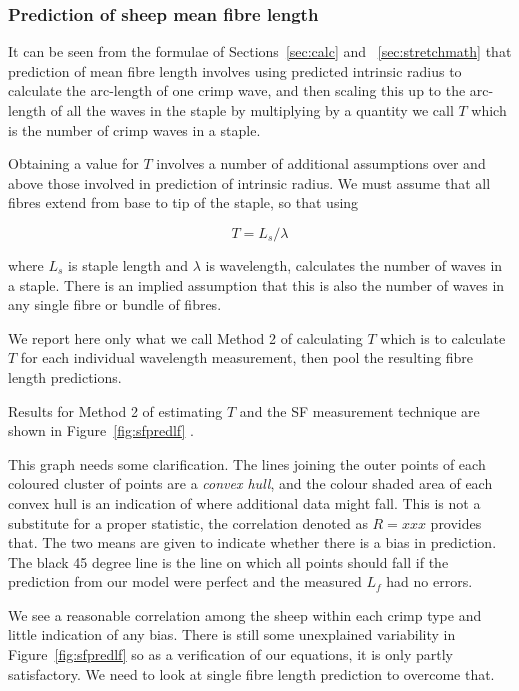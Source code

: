 \documentclass[titlepage,10pt]{article}  %
\begin{document}
\subsubsection{Prediction of sheep mean fibre length}
It can be seen from the formulae of Sections~\ref{sec:calc} and ~\ref{sec:stretchmath} that prediction of mean fibre length involves using predicted intrinsic radius to calculate the arc-length of one crimp wave, and then  scaling this up to the arc-length of all the waves in the staple by multiplying by a quantity we call $T$ which is the number of crimp waves in a staple.

Obtaining a value for $T$ involves a number of additional assumptions over and above those involved in prediction of intrinsic radius. We must assume that all fibres extend from base to tip of the staple, so that using

\begin{equation}
\label{eqn:T}
T = L_{s}/\lambda
\end{equation}

where $L_{s}$ is staple length and $\lambda$ is wavelength,
calculates the number of waves in a staple. There is an implied assumption that this is also the number of waves in any single fibre or bundle of fibres.


We report here only what we call Method 2 of calculating $T$ which is to calculate $T$ for each individual wavelength measurement, then pool the resulting fibre length predictions.



Results for Method 2  of estimating $T$ and the SF measurement technique are shown in Figure~\ref{fig:sfpredlf} .



This graph needs some clarification. The lines joining the outer points of each coloured cluster of points are a {\em convex hull}, and the colour shaded area of each convex hull is an indication of where additional data might fall. This is not a substitute for a proper statistic, the correlation denoted as $R = xxx$ provides that. The two means are given to indicate whether there is a bias in prediction. The black 45 degree line is the line on which all points should fall if the prediction from our model were perfect and the measured $L_{f}$ had no errors.

We see a reasonable correlation among the sheep within each crimp type and little indication of any bias. There is still some unexplained variability in Figure~\ref{fig:sfpredlf} so as a verification of our equations, it is only partly satisfactory. We need to look at single fibre length prediction to overcome that. 
\end{document}
